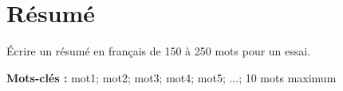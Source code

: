 \chapter*{Résumé}

Écrire un résumé en français de 150 à 250 mots pour un essai.

\noindent\textbf{Mots-clés :} mot1; mot2; mot3; mot4; mot5; ...; 10 mots maximum

\newpage